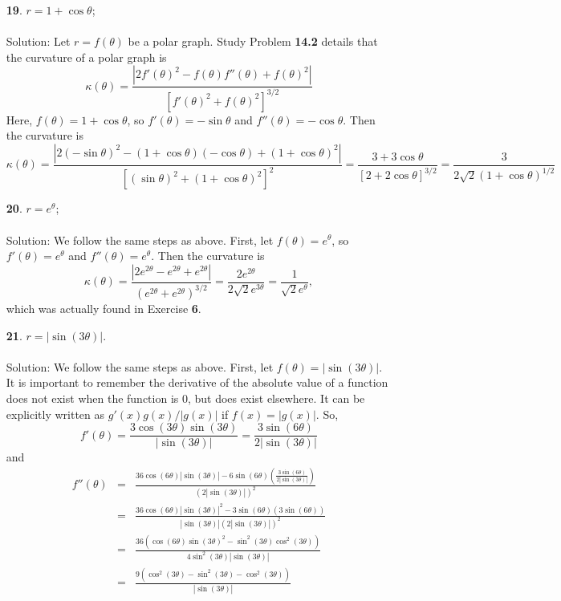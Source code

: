 \documentclass[12pt]{amsbook}
\begin{document}
\begin{enumerate}
  \item[{\small\bf 19}.] $r=1+\cos\theta$;
  \\
  \\
  {\sc Solution}: Let $r=f(\theta)$ be a polar graph. Study Problem {\bf 14.2} details that the curvature of a polar graph is
  $$\kappa(\theta)=\frac{|2f'(\theta)^2-f(\theta)f''(\theta)+f(\theta)^2|}{[f'(\theta)^2+f(\theta)^2]^{3/2}}$$
  Here, $f(\theta)=1+\cos\theta$, so $f'(\theta)=-\sin\theta$ and $f''(\theta)=-\cos\theta$. Then the curvature is
  $$\kappa(\theta)=\frac{|2(-\sin\theta)^2-(1+\cos\theta)(-\cos \theta)+(1+\cos\theta)^2|}{[(\sin\theta)^2+(1+\cos\theta)^2]^2}=\frac{3+3\cos\theta}{[2+2\cos\theta]^{3/2}}=\frac{3}{2\sqrt{2}(1+\cos\theta)^{1/2}}$$
  \item[{\small\bf 20}.] $r=e^{\theta}$;
  \\
  \\
  {\sc Solution}: We follow the same steps as above. First, let $f(\theta)=e^{\theta}$, so $f'(\theta)=e^{\theta}$ and $f''(\theta)=e^{\theta}$. Then the curvature is
  $$\kappa(\theta)=\frac{|2e^{2\theta}-e^{2\theta}+e^{2\theta}|}{(e^{2\theta}+e^{2\theta})^{3/2}}=\frac{2e^{2\theta}}{2\sqrt{2}e^{3\theta}}=\frac{1}{\sqrt{2}e^{\theta}},$$
  which was actually found in Exercise {\bf 6}. 
  \item[{\small\bf 21}.] $r=|\sin(3\theta)|$.
  \\
  \\
  {\sc Solution}: We follow the same steps as above. First, let $f(\theta)=|\sin(3\theta)|$. It is important to remember the derivative of the absolute value of a function does not exist when the function is $0$, but does exist elsewhere. It can be explicitly written as $g'(x)g(x)/|g(x)|$ if $f(x)=|g(x)|$. So,
 $$f'(\theta)=\frac{3\cos(3\theta)\sin(3\theta)}{|\sin(3\theta)|}=\frac{3\sin(6\theta)}{2|\sin(3\theta)|}$$ and 
 \begin{eqnarray*}
 f''(\theta)&=&\frac{36\cos(6\theta)|\sin(3\theta)|-6\sin(6\theta)(\frac{3\sin(6\theta)}{2|\sin(3\theta)|})}{(2|\sin(3\theta)|)^2}\\
 &=&\frac{36\cos(6\theta)|\sin(3\theta)|^2-3\sin(6\theta)(3\sin(6\theta))}{|\sin(3\theta)|(2|\sin(3\theta)|)^2}\\
  &=&\frac{36(\cos(6\theta)\sin(3\theta)^2-\sin^2(3\theta)\cos^2(3\theta))}{4\sin^2(3\theta)|\sin(3\theta)|}\\
   &=&\frac{9(\cos^2(3\theta)-\sin^2(3\theta)-\cos^2(3\theta))}{|\sin(3\theta)|}\\

\end{eqnarray*}
\end{enumerate}
\end{document}
